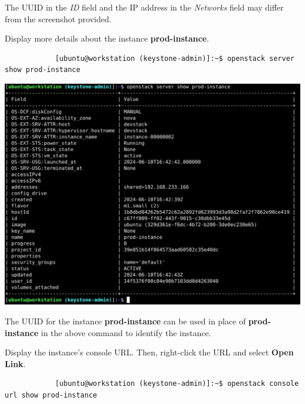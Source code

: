 \documentclass[letterpaper, 12pt]{article}
\begin{document}
\begin{enumerate}
    \begin{notebox}
        The UUID in the \textit{ID} field and the IP address in the \textit{Networks} field may differ from the screenshot provided.
    \end{notebox}

    \begin{labstep}
        Display more details about the instance \textbf{prod-instance}.
        \begin{lstlisting}
            [ubuntu@workstation (keystone-admin)]:~$ openstack server show prod-instance
        \end{lstlisting}

        \begin{center}
            \includegraphics[width=\linewidth]{images/part2/step9.png}
        \end{center}
    \end{labstep}

    \begin{tipbox}
        The UUID for the instance \textbf{prod-instance} can be used in place of \textbf{prod-instance} in the above command to identify the instance.
    \end{tipbox}

    \begin{labstep}
        Display the instance's console URL.
        Then, right-click the URL and select \textbf{Open Link}.
        \begin{lstlisting}
            [ubuntu@workstation (keystone-admin)]:~$ openstack console url show prod-instance
        \end{lstlisting}


\end{labstep}
\end{enumerate}
\end{document}

